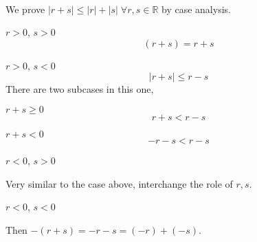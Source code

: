 \begin{pr}\leavevmode
    \\
    We prove $|r + s| \leq |r| + |s| \;\forall r,s \in \mathbb{R}$ by case analysis.
    \begin{casesp}
        \item $r > 0$, $s > 0$
        \begin{equation*}
            (r + s) = r + s
        \end{equation*}
        \item $r > 0$, $s < 0$
        \begin{equation*}
            |r + s| \leq r - s
        \end{equation*}
        There are two subcases in this one,
        \begin{casesp}
            \item $r + s \geq 0$
            \begin{equation*}
                r + s < r - s
            \end{equation*}
            \item $r + s < 0$
            \begin{equation*}
                -r - s < r - s
            \end{equation*}
        \end{casesp}
        \item $r < 0$, $s > 0$

        Very similar to the case above, interchange the role of $r, s$.
        
        \item $r < 0$, $s < 0$
        
        Then $-(r + s) = -r - s = (-r) + (-s)$.
    \end{casesp}
\end{pr}